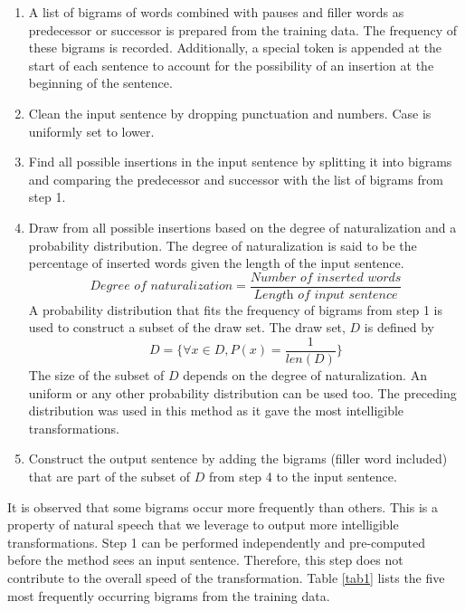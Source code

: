\documentclass[journal]{IEEEtran}
\begin{document}
\begin{enumerate}
    \item A list of bigrams of words combined with pauses and filler words as predecessor or successor is prepared from the training data. The frequency of these bigrams is recorded. Additionally, a special token is appended at the start of each sentence to account for the possibility of an insertion at the beginning of the sentence.
    \item Clean the input sentence by dropping punctuation and numbers. Case is uniformly set to lower. 
    \item Find all possible insertions in the input sentence by splitting it into bigrams and comparing the predecessor and successor with the list of bigrams from step 1.
    \item Draw from all possible insertions based on the degree of naturalization and a probability distribution. The degree of naturalization is said to be the percentage of inserted words given the length of the input sentence.
    \begin{equation}
        \textit{Degree of naturalization} = \frac{\textit{Number of inserted words}}{\textit{Length of input sentence}}
    \end{equation}
    A probability distribution that fits the frequency of bigrams from step 1 is used to construct a subset of the draw set. The draw set, $D$ is defined by
    \begin{equation}
        D = \{\forall x \in D, P(x)=\frac{1}{len(D)}\}
    \end{equation}
    The size of the subset of $D$ depends on the degree of naturalization.
    An uniform or any other probability distribution can be used too. The preceding distribution was used in this method as it gave the most intelligible transformations.  
    \item Construct the output sentence by adding the bigrams (filler word included) that are part of the subset of $D$ from step 4 to the input sentence.
\end{enumerate}

It is observed that some bigrams occur more frequently than others. This is a property of natural speech that we leverage to output more intelligible transformations. Step 1 can be performed independently and pre-computed before the method sees an input sentence. Therefore, this step does not contribute to the overall speed of the transformation. Table \ref{tab1} lists the five most frequently occurring bigrams from the training data.
\end{document}

